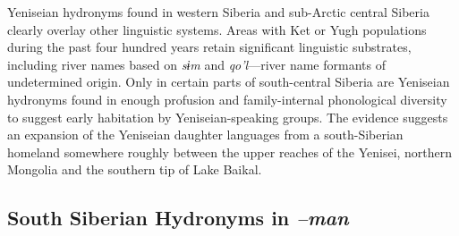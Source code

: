 Yeniseian hydronyms found in western Siberia and sub-Arctic central Siberia clearly overlay other linguistic systems. Areas with Ket or Yugh populations during the past four hundred years retain significant linguistic substrates, including river names based on \textit{sɨm} and \textit{qo’l}---river name formants of undetermined origin. Only in certain parts of south-central Siberia are Yeniseian hydronyms found in enough profusion and family-internal phonological diversity to suggest early habitation by Yeniseian-speaking groups. The evidence suggests an expansion of the Yeniseian daughter languages from a south-Siberian homeland somewhere roughly between the upper reaches of the Yenisei, northern Mongolia and the southern tip of Lake Baikal.

\subsection{South Siberian Hydronyms in \textit{–man}}

